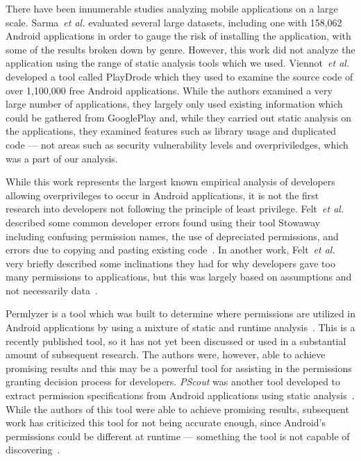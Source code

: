 \documentclass[conference]{IEEEtran}
\begin{document}
There have been innumerable studies analyzing mobile applications on a large scale. Sarma~\emph{et al.} evaluated several large datasets, including one with 158,062 Android applications in order to gauge the risk of installing the application, with some of the results broken down by genre. However, this work did not analyze the application using the range of static analysis tools which we used. Viennot~\emph{et al.} developed a tool called PlayDrode which they used to examine the source code of over 1,100,000 free Android applications. While the authors examined a very large number of applications, they largely only used existing information which could be gathered from GooglePlay and, while they carried out static analysis on the applications, they examined features such as library usage and duplicated code --- not areas such as security vulnerability levels and overpriviledges, which was a part of our analysis.


While this work represents the largest known empirical analysis of developers allowing overprivileges to occur in Android applications, it is not the first research into developers not following the principle of least privilege. Felt~\emph{et al.} described some common developer errors found using their tool Stowaway including confusing permission names, the use of depreciated permissions, and errors due to copying and pasting existing code~\cite{Felt:2011:APD:2046707.2046779}. In another work, Felt~\emph{et al.} very briefly described some inclinations they had for why developers gave too many permissions to applications, but this was largely based on assumptions and not necessarily data~\cite{Felt:2011:EAP:2002168.2002175}.



Permlyzer is a tool which was built to determine where permissions are utilized in Android applications by using a mixture of static and runtime analysis~\cite{6698893}. This is a recently published tool, so it has not yet been discussed or used in a substantial amount of subsequent research. The authors were, however, able to achieve promising results and this may be a powerful tool for assisting in the permissions granting decision process for developers. \emph{PScout} was another tool developed to extract permission specifications from Android applications using static analysis~\cite{Au:2012:PAA:2382196.2382222}. While the authors of this tool were able to achieve promising results, subsequent work has criticized this tool for not being accurate enough, since Android's permissions could be different at runtime --- something the tool is not capable of discovering~\cite{zhang2013vetting}.
\end{document}
